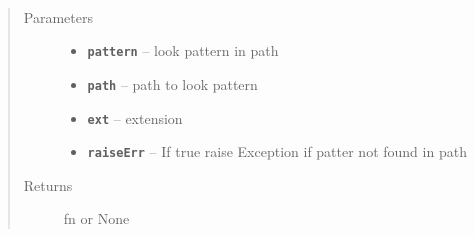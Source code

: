 \documentclass[letterpaper,10pt,english]{sphinxmanual}
\begin{document}

\begin{fulllineitems}
\label{RRtoolbox.lib:RRtoolbox.lib.root.lookinglob}~\begin{quote}\begin{description}
\item[{Parameters}] \leavevmode\begin{itemize}
\item {} 
\textbf{\texttt{pattern}} -- look pattern in path

\item {} 
\textbf{\texttt{path}} -- path to look pattern

\item {} 
\textbf{\texttt{ext}} -- extension

\item {} 
\textbf{\texttt{raiseErr}} -- If true raise Exception if patter not found in path

\end{itemize}

\item[{Returns}] \leavevmode
fn or None

\end{description}\end{quote}

\end{fulllineitems}

\end{document}
